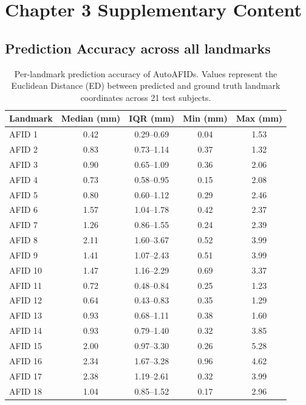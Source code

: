 \chapter{Chapter 3 Supplementary Content}\label{app:ch3suppcontent}
\newpage

\section{Prediction Accuracy across all landmarks}\label{app:Chap}

\begin{table}[H]
\centering
\small
\caption{Per-landmark prediction accuracy of AutoAFIDs. Values represent the Euclidean Distance (ED) between predicted and ground truth landmark coordinates across 21 test subjects.}
\label{tab:autoafids_accuracy}
\begin{tabular}{lcccc}
\toprule
\textbf{Landmark} & \textbf{Median (mm)} & \textbf{IQR (mm)} & \textbf{Min (mm)} & \textbf{Max (mm)} \\
\midrule
AFID 1 & 0.42 & 0.29--0.69 & 0.04 & 1.53 \\
AFID 2 & 0.83 & 0.73--1.14 & 0.37 & 1.32 \\
AFID 3 & 0.90 & 0.65--1.09 & 0.36 & 2.06 \\
AFID 4 & 0.73 & 0.58--0.95 & 0.15 & 2.08 \\
AFID 5 & 0.80 & 0.60--1.12 & 0.29 & 2.46 \\
AFID 6 & 1.57 & 1.04--1.78 & 0.42 & 2.37 \\
AFID 7 & 1.26 & 0.86--1.55 & 0.24 & 2.39 \\
AFID 8 & 2.11 & 1.60--3.67 & 0.52 & 3.99 \\
AFID 9 & 1.41 & 1.07--2.43 & 0.51 & 3.99 \\
AFID 10 & 1.47 & 1.16--2.29 & 0.69 & 3.37 \\
AFID 11 & 0.72 & 0.48--0.84 & 0.25 & 1.23 \\
AFID 12 & 0.64 & 0.43--0.83 & 0.35 & 1.29 \\
AFID 13 & 0.93 & 0.68--1.11 & 0.38 & 1.60 \\
AFID 14 & 0.93 & 0.79--1.40 & 0.32 & 3.85 \\
AFID 15 & 2.00 & 0.97--3.30 & 0.26 & 5.28 \\
AFID 16 & 2.34 & 1.67--3.28 & 0.96 & 4.62 \\
AFID 17 & 2.38 & 1.19--2.61 & 0.32 & 3.99 \\
AFID 18 & 1.04 & 0.85--1.52 & 0.17 & 2.96 \\

\end{tabular}
\end{table}
